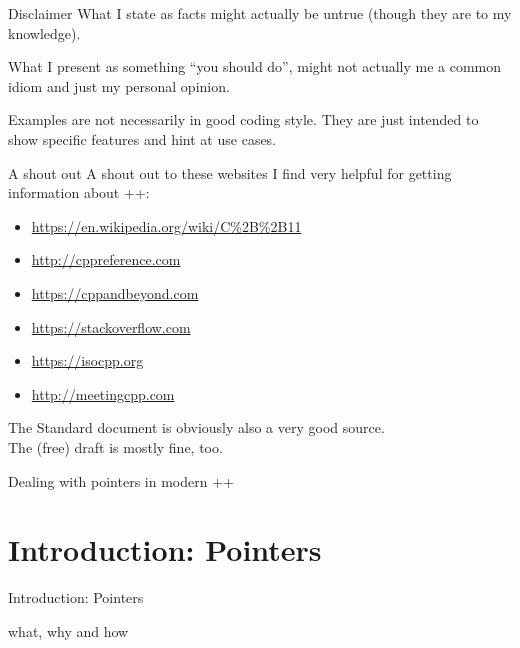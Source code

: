 	\begin{frame}{Disclaimer}
		What I state as facts might actually be untrue (though they are to my knowledge).
		
		\emptyline
		
		What I present as something ``you should do'', might not actually me a common idiom
		and just my personal opinion.
		
		\pause
		
		\emptyline
		Examples are not necessarily in good coding style. They are just intended to show specific features and hint at use cases.
		
	\end{frame}
	
	\begin{frame}{A shout out}
		A shout out to these websites I find very helpful for getting information about \C++:
		\begin{itemize}
			\item \url{https://en.wikipedia.org/wiki/C\%2B\%2B11}
			\item \url{http://cppreference.com}
			\item \url{https://cppandbeyond.com}
			\item \url{https://stackoverflow.com}
			\item \url{https://isocpp.org}
			\item \url{http://meetingcpp.com}
		\end{itemize}
		
		\pause
		
		\emptyline
		The Standard document is obviously also a very good source. \\
		The (free) draft is mostly fine, too.
	\end{frame}
	
	\begin{frame}{Dealing with pointers in modern \C++}
		\begin{small}
			\tableofcontents
		\end{small}
	\end{frame}
	
	\section{Introduction: Pointers}
	\begin{frame}
		\begin{center}
			{\Huge Introduction: Pointers}
			
			\emptyline
			{\Large what, why and how}
		\end{center}
	\end{frame}
	
